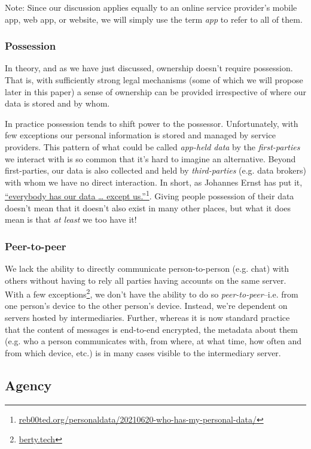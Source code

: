 \documentclass[11pt, oneside]{article}   	%
\newcommand{\hyperfootnote}[1][]{\def\ArgI{{#1}}\hyperfootnoteRelay}
\newcommand\hyperfootnoteRelay[2][]{\href{#1#2}{\ArgI}\footnote{\href{#1#2}{#2}}}
\begin{document}
Note: Since our discussion applies equally to an online service provider's mobile app, web app, or website, we will simply use the term \emph{app} to refer to all of them.

\subsubsection{Possession} 

In theory, and as we have just discussed, ownership doesn't require possession. That is, with sufficiently strong legal mechanisms (some of which we will propose later in this paper) a sense of ownership can be provided irrespective of where our data is stored and by whom. 

In practice possession tends to shift power to the possessor. Unfortunately, with few exceptions our personal information is stored and managed by service providers. This pattern of what could be called \emph{app-held data} by the \emph{first-parties} we interact with is so common that it's hard to imagine an alternative. Beyond first-parties, our data is also collected and held by \emph{third-parties} (e.g. data brokers) with whom we have no direct interaction. In short, as Johannes Ernst has put it, \hyperfootnote[“everybody has our data … except us.”][https://]{reb00ted.org/personaldata/20210620-who-has-my-personal-data/}. Giving people possession of their data doesn't mean that it doesn't also exist in many other places, but what it does mean is that \emph{at least} we too have it!

\subsubsection{Peer-to-peer}

We lack the ability to directly communicate person-to-person (e.g. chat) with others without having to rely all parties having accounts on the same server. With a few exceptions\hyperfootnote[][https://]{berty.tech}, we don't have the ability to do so \emph{peer-to-peer}--i.e. from one person's device to the other person's device. Instead, we're dependent on servers hosted by intermediaries. Further, whereas it is now standard practice that the content of messages is end-to-end encrypted, the metadata about them (e.g. who a person communicates with, from where, at what time, how often and from which device, etc.) is in many cases visible to the intermediary server.  

\subsection{Agency}
\end{document}
